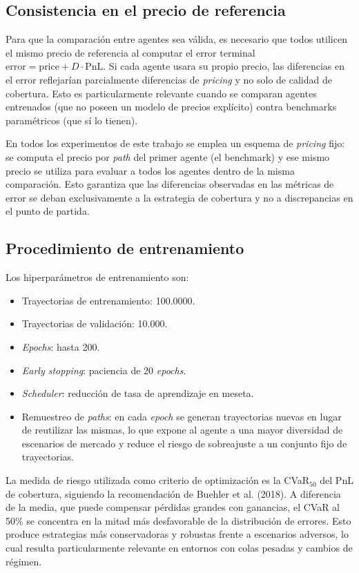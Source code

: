 \documentclass[11pt,a4paper,spanish]{article}
\numberwithin{equation}{section} %
\begin{document}
\subsection{Consistencia en el precio de referencia}\label{subsec:fairness_pricing}

Para que la comparación entre agentes sea válida, es necesario que todos utilicen el mismo precio de referencia al computar el error terminal $\text{error} = \text{price} + D \cdot \text{PnL}$. Si cada agente usara su propio precio, las diferencias en el error reflejarían parcialmente diferencias de \textit{pricing} y no solo de calidad de cobertura. Esto es particularmente relevante cuando se comparan agentes entrenados (que no poseen un modelo de precios explícito) contra benchmarks paramétricos (que sí lo tienen).

En todos los experimentos de este trabajo se emplea un esquema de \textit{pricing} fijo: se computa el precio por \textit{path} del primer agente (el benchmark) y ese mismo precio se utiliza para evaluar a todos los agentes dentro de la misma comparación. Esto garantiza que las diferencias observadas en las métricas de error se deban exclusivamente a la estrategia de cobertura y no a discrepancias en el punto de partida.

\subsection{Procedimiento de entrenamiento}

Los hiperparámetros de entrenamiento son:

\begin{itemize}
    \item Trayectorias de entrenamiento: 100.0000.
    \item Trayectorias de validación: 10.000.
    \item \textit{Epochs}: hasta 200.
    \item \textit{Early stopping}: paciencia de 20 \textit{epochs}.
    \item \textit{Scheduler}: reducción de tasa de aprendizaje en meseta.
    \item Remuestreo de \textit{paths}: en cada \textit{epoch} se generan trayectorias nuevas en lugar de reutilizar las mismas, lo que expone al agente a una mayor diversidad de escenarios de mercado y reduce el riesgo de sobreajuste a un conjunto fijo de trayectorias.
\end{itemize}


La medida de riesgo utilizada como criterio de optimización es la CVaR$_{50}$ del PnL de cobertura, siguiendo la recomendación de Buehler et al. (2018). A diferencia de la media, que puede compensar pérdidas grandes con ganancias, el CVaR al 50\% se concentra en la mitad más desfavorable de la distribución de errores. Esto produce estrategias más conservadoras y robustas frente a escenarios adversos, lo cual resulta particularmente relevante en entornos con colas pesadas y cambios de régimen.
\end{document}
